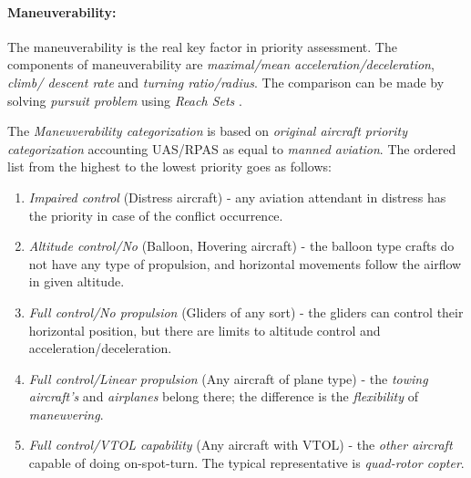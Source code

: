 \paragraph{Maneuverability:} The maneuverability is the real key factor in priority assessment.  The components of maneuverability are \emph{maximal/mean acceleration/deceleration}, \emph{climb/ descent rate} and \emph{turning ratio/radius}. The comparison can be made by solving \emph{pursuit problem} using \emph{Reach Sets} \cite{game1987,game1988}.

\noindent The \emph{Maneuverability categorization} is based on \emph{original aircraft priority categorization} \cite{icaoAnnex2} accounting UAS/RPAS as equal to \emph{manned aviation}. The ordered list from the highest to the lowest priority goes as follows:

\begin{enumerate}
    \item \emph{Impaired control} (Distress aircraft) - any aviation attendant in distress has the priority in case of the conflict occurrence.
    
    \item \emph{Altitude control/No} (Balloon, Hovering aircraft) - the balloon type crafts do not have any type of propulsion, and horizontal movements follow the airflow in given altitude. 
    
    
    \item \emph{Full control/No propulsion} (Gliders of any sort) - the gliders can control their horizontal position, but there are limits to altitude control and acceleration/deceleration. 
    
    \item \emph{Full control/Linear propulsion} (Any aircraft of plane type) - the \emph{towing aircraft's} and \emph{airplanes} belong there; the difference is the \emph{flexibility} of \emph{maneuvering}.
    
    \item \emph{Full control/VTOL capability} (Any aircraft with VTOL) - the \emph{other aircraft} capable of doing on-spot-turn. The typical representative is \emph{quad-rotor copter}.
\end{enumerate}



